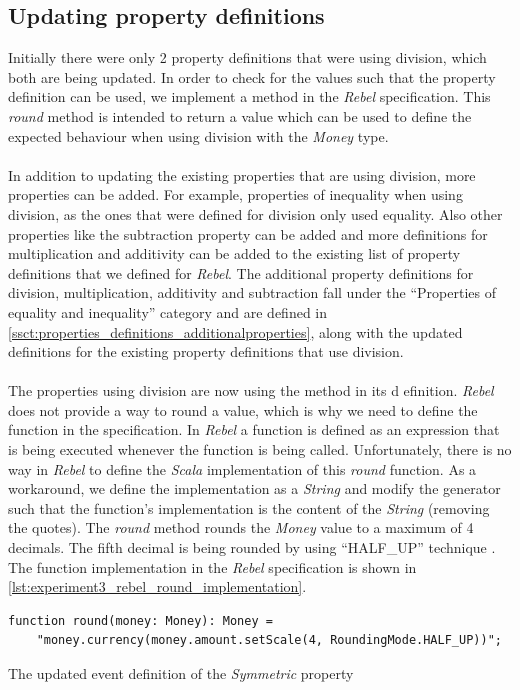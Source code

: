 \subsection{Updating property definitions}
Initially there were only 2 property definitions that were using division, which both are being updated. In order to check for the values such that the property definition can be used, we implement a  method in the \textit{Rebel} specification. This \textit{round} method is intended to return a value which can be used to define the expected behaviour when using division with the \textit{Money} type.\\
\\
In addition to updating the existing properties that are using division, more properties can be added. For example, properties of inequality when using division, as the ones that were defined for
division only used equality. Also other properties like the subtraction property can
be added and more definitions for multiplication and additivity
can be added to the existing list of property definitions that we defined for \textit{Rebel}. The
additional property definitions for division, multiplication, additivity and
subtraction fall under the ``Properties of equality and inequality'' category
and are defined in \autoref{ssct:properties_definitions_additionalproperties},
along with the updated definitions for the existing property definitions that
use division. \\
\\
The properties using division are now using the  method in its d
efinition. \textit{Rebel} does not provide a way to round a value, which is why
we need to define the function in the specification. In \textit{Rebel} a
function is defined as an expression that is being executed whenever the
function is being called. Unfortunately, there is no way in \textit{Rebel} to
define the \textit{Scala} implementation of this \textit{round} function. As a
workaround, we define the implementation as a \textit{String} and modify the
generator such that the function's implementation is the content of the
\textit{String} (removing the quotes). The \textit{round} method rounds the
\textit{Money} value to a maximum of 4 decimals. The fifth decimal is being
rounded by using ``HALF\_UP'' technique
. The function implementation
in the \textit{Rebel} specification is shown in
\autoref{lst:experiment3_rebel_round_implementation}.
\FloatBarrier
\begin{sourcecode}[!ht]
\begin{lstlisting}[language=Rebel]
function round(money: Money): Money =
    "money.currency(money.amount.setScale(4, RoundingMode.HALF_UP))";
\end{lstlisting}
\caption{The updated event definition of the \textit{Symmetric} property}
\label{lst:experiment3_rebel_round_implementation}
\end{sourcecode}
\FloatBarrier

